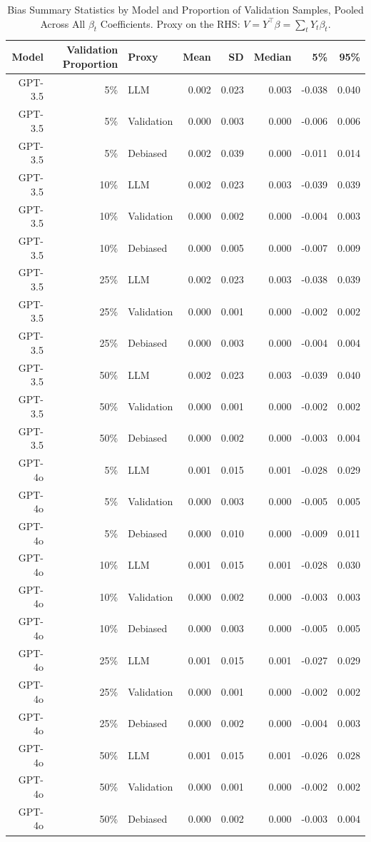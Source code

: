 \begin{table}

\caption{Bias Summary Statistics by Model and Proportion of Validation Samples, Pooled Across All $\beta_{t}$ Coefficients. Proxy on the RHS: $V = Y^\top \beta = \sum_{t} Y_t \beta_t$.}
\centering
\begin{tabular}[t]{rrlrrrrr}
\toprule
Model & Validation Proportion & Proxy & Mean & SD & Median & 5\% & 95\%\\
\midrule
GPT-3.5 & 5\% & LLM & 0.002 & 0.023 & 0.003 & -0.038 & 0.040\\
GPT-3.5 & 5\% & Validation & 0.000 & 0.003 & 0.000 & -0.006 & 0.006\\
GPT-3.5 & 5\% & Debiased & 0.002 & 0.039 & 0.000 & -0.011 & 0.014\\
GPT-3.5 & 10\% & LLM & 0.002 & 0.023 & 0.003 & -0.039 & 0.039\\
GPT-3.5 & 10\% & Validation & 0.000 & 0.002 & 0.000 & -0.004 & 0.003\\
GPT-3.5 & 10\% & Debiased & 0.000 & 0.005 & 0.000 & -0.007 & 0.009\\
GPT-3.5 & 25\% & LLM & 0.002 & 0.023 & 0.003 & -0.038 & 0.039\\
GPT-3.5 & 25\% & Validation & 0.000 & 0.001 & 0.000 & -0.002 & 0.002\\
GPT-3.5 & 25\% & Debiased & 0.000 & 0.003 & 0.000 & -0.004 & 0.004\\
GPT-3.5 & 50\% & LLM & 0.002 & 0.023 & 0.003 & -0.039 & 0.040\\
GPT-3.5 & 50\% & Validation & 0.000 & 0.001 & 0.000 & -0.002 & 0.002\\
GPT-3.5 & 50\% & Debiased & 0.000 & 0.002 & 0.000 & -0.003 & 0.004\\
GPT-4o & 5\% & LLM & 0.001 & 0.015 & 0.001 & -0.028 & 0.029\\
GPT-4o & 5\% & Validation & 0.000 & 0.003 & 0.000 & -0.005 & 0.005\\
GPT-4o & 5\% & Debiased & 0.000 & 0.010 & 0.000 & -0.009 & 0.011\\
GPT-4o & 10\% & LLM & 0.001 & 0.015 & 0.001 & -0.028 & 0.030\\
GPT-4o & 10\% & Validation & 0.000 & 0.002 & 0.000 & -0.003 & 0.003\\
GPT-4o & 10\% & Debiased & 0.000 & 0.003 & 0.000 & -0.005 & 0.005\\
GPT-4o & 25\% & LLM & 0.001 & 0.015 & 0.001 & -0.027 & 0.029\\
GPT-4o & 25\% & Validation & 0.000 & 0.001 & 0.000 & -0.002 & 0.002\\
GPT-4o & 25\% & Debiased & 0.000 & 0.002 & 0.000 & -0.004 & 0.003\\
GPT-4o & 50\% & LLM & 0.001 & 0.015 & 0.001 & -0.026 & 0.028\\
GPT-4o & 50\% & Validation & 0.000 & 0.001 & 0.000 & -0.002 & 0.002\\
GPT-4o & 50\% & Debiased & 0.000 & 0.002 & 0.000 & -0.003 & 0.004\\
\bottomrule
\end{tabular}
\end{table}
